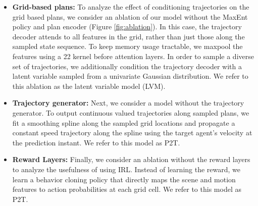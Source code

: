 \documentclass[journal]{IEEEtran}
\begin{document}
\begin{itemize}
    
\item \textbf{Grid-based plans:} To analyze the effect of conditioning trajectories on the grid based plans, we consider an ablation of our model without the MaxEnt policy and plan encoder (Figure \ref{fig:ablation}). In this case, the trajectory decoder attends to all features in the grid, rather than just those along the sampled state sequence. To keep memory usage tractable, we maxpool the features using a 22 kernel before attention layers. In order to sample a diverse set of trajectories, we additionally condition the trajectory decoder with a latent variable  sampled from a univariate Gaussian distribution. We refer to this ablation as the latent variable model (LVM). 

\vspace{0.05in}
 
\item \textbf{Trajectory generator:} Next, we consider a model without the trajectory generator. To output continuous valued trajectories along sampled plans, we fit a smoothing spline along the sampled grid locations and propagate a constant speed trajectory along the spline using the target agent's velocity at the prediction instant. We refer to this model as P2T.

\vspace{0.05in}

\item \textbf{Reward Layers:} Finally, we consider an ablation without the reward layers to analyze the usefulness of using IRL. Instead of learning the reward, we learn a behavior cloning policy that directly maps the scene and motion features to action probabilities at each grid cell. We refer to this model as P2T.

\end{itemize}

\vspace{0.05in}
\end{document}
